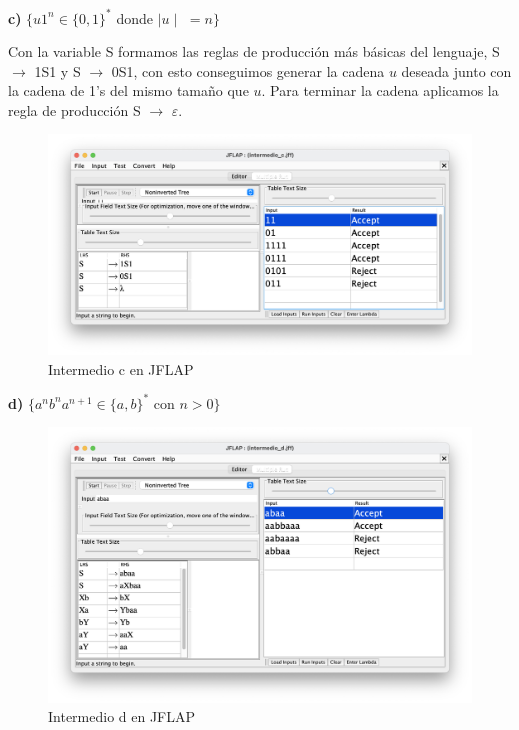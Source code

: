 \textbf{c)}  $\{ u1^{n} \in \{0,1\}^{\ast} $ donde $\mid u \mid$ $= n \}$

Con la variable S formamos las reglas de producción más básicas del lenguaje, S $\rightarrow$ 1S1 y S $\rightarrow$ 0S1, con esto conseguimos generar la cadena $u$ deseada 
junto con la cadena de 1's del mismo tamaño que $u$. Para terminar la cadena aplicamos la regla de producción S $\rightarrow$ $\varepsilon$.
 
\begin{figure}[H] 
	\centering
	\includegraphics[scale=0.35]{../practica_1/images/intermedio_c.png} 
	\caption{Intermedio c en JFLAP} 
    \label{fig:intermedio_c}
\end{figure}

\textbf{d)}  $\{ a^{n} b^{n} a^{n+1} \in \{a,b\}^{\ast}$ con $n > 0\}$

\begin{figure}[H] 
	\centering
	\includegraphics[scale=0.35]{../practica_1/images/intermedio_d.png} 
	\caption{Intermedio d en JFLAP} 
    \label{fig:intermedio_d}
\end{figure}

